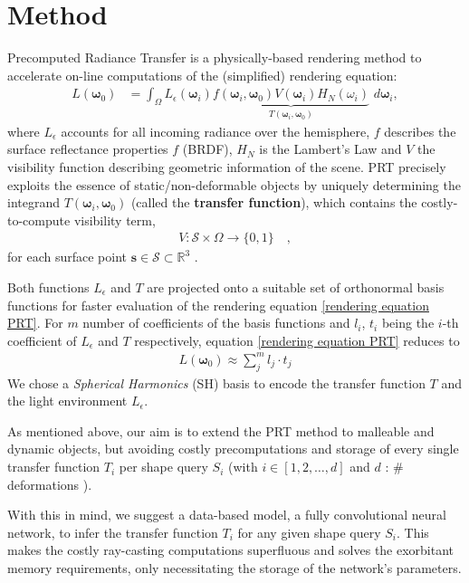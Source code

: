 \section{Method}
Precomputed Radiance Transfer  is a physically-based rendering method to accelerate on-line computations of the (simplified) rendering equation:
\begin{align}
L(\bm{\omega}_0 ) &= 
\int_{\Omega}   L_{\epsilon}(\bm{\omega}_i ) 
\underbrace{f(\bm{\omega}_i,\bm{\omega}_0) 
V(\bm{\omega}_i) H_N(\omega_i) }_{T(\bm{\omega}_i,\bm{\omega}_0) }
\,  \, d\bm{\omega}_i , 
\label{rendering equation PRT}
\end{align}
where $L_{\epsilon}$ accounts for all incoming radiance over the hemisphere, $f$  describes the surface reflectance properties $f$ (BRDF), $H_N$ is the Lambert's Law and $V$ the visibility function describing geometric information of the scene. PRT precisely exploits the essence of static/non-deformable objects by uniquely determining the integrand $T(\bm{\omega}_i,\bm{\omega}_0)$ (called the \textbf{transfer function}), which contains the costly-to-compute  visibility term,
\begin{align*}
V :  \mathcal{S}  \times \Omega \rightarrow \{0,1\} \quad,
\end{align*}
for each surface point $\bm{s} \in \mathcal{S} \subset \mathbb{R}^3$ \cite{CohenBook}. 

Both functions $L_{\epsilon} $ and $T$  are projected onto a suitable set of orthonormal basis functions for faster evaluation of the rendering equation \ref{rendering equation PRT}. 
For $m$ number of coefficients of the basis functions and $l_i$, $t_i$ being the $i$-th coefficient of $L_{\epsilon} $ and $T$ respectively, equation \ref{rendering equation PRT} reduces to \cite{sloan2002precomputed} 
\begin{align}
L(\bm{\omega}_0 ) \approx \sum_{j}^{m} l_j \cdot t_j 
\label{Eq: Reduced Rendering Eq}
\end{align}
We chose a \textit{Spherical Harmonics} (SH) basis to encode the transfer function $T$ and the light environment $L_{\epsilon}$.

As mentioned above, our aim is to extend the PRT method to malleable and dynamic objects, but avoiding costly precomputations and storage of every single transfer function $T_i$ per shape query $S_i$ (with $i \in [1,2,\dots, d]$ and $d$ : $\#$ deformations ).

With this in mind, we suggest a data-based model, a fully convolutional neural network, to infer the transfer function $T_i$ for any given shape query $S_i$. 
This makes the costly ray-casting computations superfluous and solves the exorbitant memory requirements, only necessitating the storage of the network's parameters.

